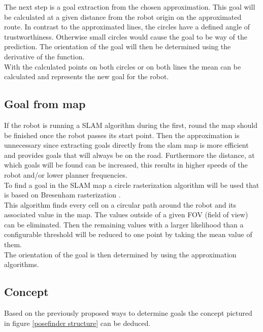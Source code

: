 The next step is a goal extraction from the chosen approximation. This goal will be calculated at a given distance from the robot origin on the approximated route. In contrast to the approximated lines, the circles have a defined angle of trustworthiness. Otherwise small circles would cause the goal to be way of the prediction. The orientation of the goal will then be determined using the derivative of the function.\\

With the calculated points on both circles or on both lines the mean can be calculated and represents the new goal for the robot.

\subsection{Goal from map}

If the robot is running a SLAM algorithm during the first, round the map should be finished once the robot passes its start point. Then the approximation is unnecessary since extracting goals directly from the slam map is more efficient and provides goals that will  always be on the road. Furthermore the distance, at which goals will be found can be increased, this results in higher speeds of the robot and/or lower planner frequencies.\\

To find a goal in the SLAM map a circle rasterization algorithm will be used that is based on Bresenham rasterization \cite{ComputerGraphics}.\\

This algorithm finds every cell on a circular path around the robot and its associated value in the map. The values outside of a given FOV (field of view) can be eliminated. Then the remaining values with a larger likelihood than a configurable threshold will be reduced to one point by taking the mean value of them.\\

The orientation of the goal is then determined by using the approximation algorithms.

\subsection{Concept}

Based on the previously proposed ways to determine goals the concept pictured in figure \ref{posefinder structure} can be deduced.\\


